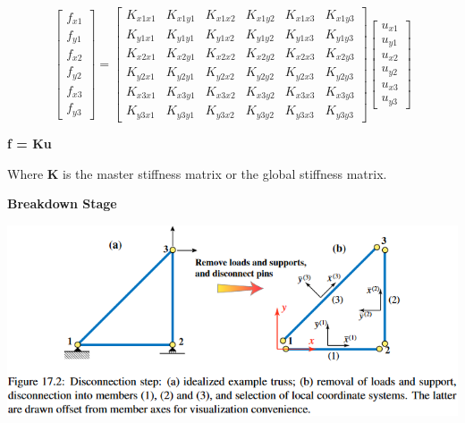 \documentclass{article}
\begin{document}
\begin{multicols*}{2}
    \begin{equation*} 
        \begin{bmatrix}
            f_{x1}\\
            f_{y1}\\
            f_{x2}\\
            f_{y2}\\
            f_{x3}\\
            f_{y3}
        \end{bmatrix}
        =
        \begin{bmatrix}
            K_{x1x1} & K_{x1y1} & K_{x1x2} & K_{x1y2} & K_{x1x3} & K_{x1y3}\\
            K_{y1x1} & K_{y1y1} & K_{y1x2} & K_{y1y2} & K_{y1x3} & K_{y1y3}\\
            K_{x2x1} & K_{x2y1} & K_{x2x2} & K_{x2y2} & K_{x2x3} & K_{x2y3}\\
            K_{y2x1} & K_{y2y1} & K_{y2x2} & K_{y2y2} & K_{y2x3} & K_{y2y3}\\
            K_{x3x1} & K_{x3y1} & K_{x3x2} & K_{x3y2} & K_{x3x3} & K_{x3y3}\\
            K_{y3x1} & K_{y3y1} & K_{y3x2} & K_{y3y2} & K_{y3x3} & K_{y3y3}
        \end{bmatrix}
        \begin{bmatrix}
            u_{x1}\\
            u_{y1}\\
            u_{x2}\\
            u_{y2}\\
            u_{x3}\\
            u_{y3}
        \end{bmatrix} 
    \end{equation*}

    \begin{center}
        \textbf{f = Ku}
    \end{center}
     
    Where \textbf{K} is the master stiffness matrix or the global stiffness matrix.

    \textbf{Breakdown Stage}\par 
    \includegraphics[width=\linewidth]{Figures/breakdown_stage.png}


\end{multicols*}
\end{document}
